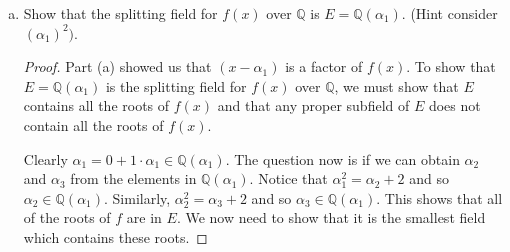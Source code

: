 \documentclass[12pt]{article}
\begin{document}
\begin{enumerate}
\begin{enumerate}[(a)]
                    \begin{proof}
                        To show that $\alpha_1$ is a root of $f(x)$, we must
                        show that $f(\alpha_1)=0$. With this we have
                        \begin{align*}
                            f(\alpha_1)&=\alpha_1^3-3\alpha_1+1 \\
                            &=(\omega^{1/3}+\omega^{-1/3})^3-3(\omega^{1/3}+\omega^{-1/3})+1
                            \\
                            &=\omega+3(\omega^{1/3}+\omega^{-1/3})
                            -3(\omega^{1/3}+\omega^{-1/3})+\omega^{-1}+1 \\
                            &=\omega+\omega^{-1}+1 \\
                            &=\frac{\omega^2+\omega+1}{\omega} \\
                            &=\frac{0}{\omega}=0.
                        \end{align*}
                    \end{proof}
                \item Show that the splitting field for $f(x)$ over
                    $\mathbb{Q}$ is $E=\mathbb{Q}(\alpha_1)$. (Hint consider
                    $(\alpha_1)^2)$. 
                    \begin{proof}
                        Part (a) showed us that $(x-\alpha_1)$ is a factor of
                        $f(x)$. To show that $E=\mathbb{Q}(\alpha_1)$ is the
                        splitting field for $f(x)$ over $\mathbb{Q}$, we must
                        show that $E$ contains all the roots of $f(x)$ and that
                        any proper subfield of $E$ does not contain all the
                        roots of $f(x)$.\par\hspace{4mm} 
                        Clearly $\alpha_1=0+1\cdot\alpha_1\in\mathbb{Q}(\alpha_1)$. The question 
                        now is if we can obtain $\alpha_2$ and $\alpha_3$ from the 
                        elements in $\mathbb{Q}(\alpha_1)$. Notice that $\alpha_1^2=\alpha_2+2$ 
                        and so $\alpha_2\in\mathbb{Q}(\alpha_1)$. Similarly, 
                        $\alpha_2^2=\alpha_3+2$ and so $\alpha_3\in\mathbb{Q}(\alpha_1)$. This 
                        shows that all of the roots of $f$ are in $E$. We now need to show 
                        that it is the smallest field which contains these roots. 

\end{proof}
\end{enumerate}
\end{enumerate}
\end{document}
